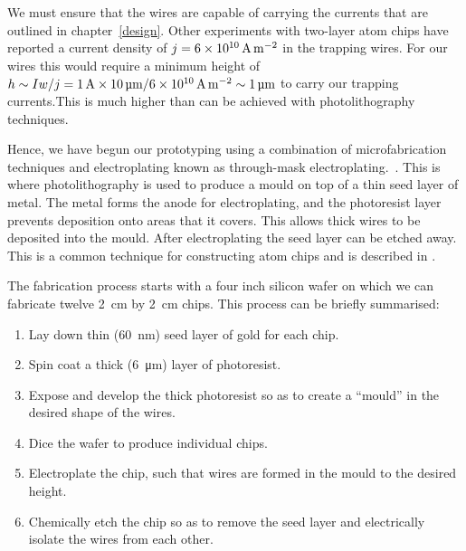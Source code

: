 We must ensure that the wires are capable of carrying the currents that are
outlined in chapter~\ref{design}.  Other experiments with two-layer atom chips
have reported a current density of $j=\SI{6E10}{\ampere\per\meter\squared}$ in
the trapping wires. For our wires this would require a minimum height of $h
\sim I w/j = \SI{1}{\ampere} \times
\SI{10}{\micro\meter}/\SI{6E10}{\ampere\per\meter\squared} \sim
\SI{1}{\micro\meter}$  to carry our trapping currents.This is much higher than
can be achieved with photolithography techniques.

Hence, we have begun our prototyping using a combination of microfabrication
techniques and electroplating known as through-mask
electroplating.~\cite{Ruythooren_2000}. This is where photolithography is used
to produce a mould on top of a thin seed layer of metal. The metal forms the
anode for electroplating, and the photoresist layer prevents deposition onto
areas that it covers. This allows thick wires to be deposited into the mould.
After electroplating the seed layer can be etched away.  This is a common
technique for constructing atom chips and is described in .

The fabrication process starts with a four inch silicon wafer on which we can
fabricate twelve \SI{2}{\centi\meter} by \SI{2}{\centi\meter}  chips. This
process can be briefly summarised:
\begin{enumerate}
\item Lay down thin (\SI{60}{\nano\meter}) seed layer of gold for each chip.
\item Spin coat a thick (\SI{6}{\micro\meter}) layer of photoresist.
\item Expose and develop the thick photoresist so as to create a ``mould''
in the desired shape of the wires.
\item Dice the wafer to produce individual chips.
\item Electroplate the chip, such that wires are formed in the mould to the
desired height.
\item Chemically etch the chip so as to remove the seed layer and
  electrically isolate the wires from each other.
\end{enumerate}
%


